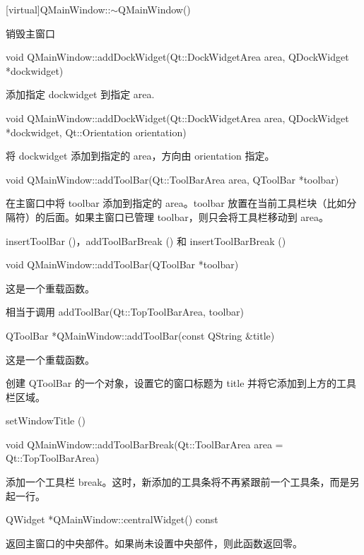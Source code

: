 \splitLine

[virtual]QMainWindow::$\sim$QMainWindow()

销毁主窗口

\splitLine

void QMainWindow::addDockWidget(Qt::DockWidgetArea area, 
    QDockWidget *dockwidget)

添加指定 dockwidget 到指定 area.

\splitLine

void QMainWindow::addDockWidget(Qt::DockWidgetArea area, QDockWidget *dockwidget, Qt::Orientation orientation)

将 dockwidget 添加到指定的 area，方向由 orientation 指定。

\splitLine

void QMainWindow::addToolBar(Qt::ToolBarArea area, QToolBar *toolbar)

在主窗口中将 toolbar 添加到指定的 area。toolbar 放置在当前工具栏块（比如分隔符）的后面。如果主窗口已管理 toolbar，则只会将工具栏移动到 area。


\begin{seeAlso}
insertToolBar ()，addToolBarBreak () 和 insertToolBarBreak ()
\end{seeAlso}

\splitLine

void QMainWindow::addToolBar(QToolBar *toolbar)

这是一个重载函数。

相当于调用 addToolBar(Qt::TopToolBarArea, toolbar)

\splitLine

QToolBar *QMainWindow::addToolBar(const QString \&title)

这是一个重载函数。

创建 QToolBar 的一个对象，设置它的窗口标题为 title 并将它添加到上方的工具栏区域。

\begin{seeAlso}
setWindowTitle ()
\end{seeAlso}

\splitLine

void QMainWindow::addToolBarBreak(Qt::ToolBarArea area = Qt::TopToolBarArea)

添加一个工具栏 break。这时，新添加的工具条将不再紧跟前一个工具条，而是另起一行。

\splitLine

QWidget *QMainWindow::centralWidget() const

返回主窗口的中央部件。如果尚未设置中央部件，则此函数返回零。


